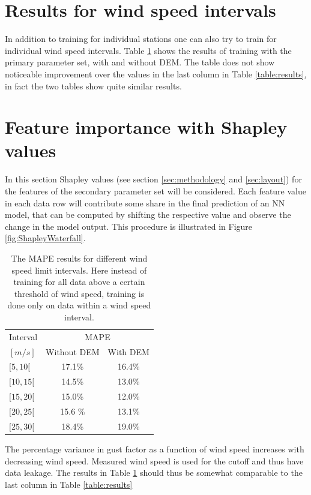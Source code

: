\section{Results for wind speed intervals}
In addition to training for individual stations one can also try to train for individual wind speed intervals. Table \ref{table:closed_intervals} shows the results of training with the primary parameter set, with and without DEM. The table does not show noticeable improvement over the values in the last column in Table \ref{table:results}, in fact the two tables show quite similar results.

\section{Feature importance with Shapley values}\label{sec:shapley}
In this section Shapley values (see section \ref{sec:methodology} and \ref{sec:layout}) for the features of the secondary parameter set will be considered. Each feature value in each data row will contribute some share in the final prediction of an NN model, that can be computed by shifting the respective value and observe the change in the model output. This procedure is illustrated in Figure \ref{fig:ShapleyWaterfall}.

\begin{table}
    \caption[Model result looking at closed wind speed intervals]{The MAPE results for different wind speed limit intervals. Here instead of training for all data above a certain threshold of wind speed, training is done only on data within a wind speed interval.}
    \label{table:closed_intervals}
    \centering
    \begin{tabular}{lcc}
        \toprule
        Interval &  \multicolumn{2}{c}{MAPE}\\
        $[m/s]$ & Without DEM & With DEM \\
        \midrule
        $[5, 10[$ & 17.1\% & 16.4\%\\
        $[10, 15[$ & 14.5\% & 13.0\%\\
        $[15, 20[$ & 15.0\% & 12.0\%\\
        $[20, 25[$ & 15.6 \% & 13.1\%\\
        $[25, 30[$ & 18.4\% & 19.0\%\\
        \bottomrule
    \end{tabular}
\end{table}

The percentage variance in gust factor as a function of wind speed increases with decreasing wind speed. Measured wind speed is used for the cutoff and thus have data leakage. The results in Table \ref{table:closed_intervals} should thus be somewhat comparable to the last column in Table \ref{table:results}

